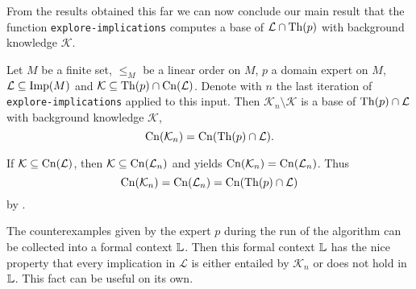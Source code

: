 From the results obtained this far we can now conclude our main result that the function
\lstinline{explore-implications} computes a base of $\mathcal{L} \cap \operatorname{Th}(p)$ with
background knowledge $\mathcal{K}$.

\begin{Theorem}
  \label{thm:explore-implications-correctness}
  Let $M$ be a finite set, $\leq_{M}$ be a linear order on $M$, $p$ a domain expert on
  $M$, $\mathcal{L} \subseteq \operatorname{Imp}(M)$ and $\mathcal{K} \subseteq \operatorname{Th}(p) \cap
  \operatorname{Cn}(\mathcal{L})$.  Denote with $n$ the last iteration of
  \lstinline{explore-implications} applied to this input.  Then $\mathcal{K}_{n} \setminus
  \mathcal{K}$ is a base of $\operatorname{Th}(p) \cap \mathcal{L}$ with background knowledge
  $\mathcal{K}$, \ie
  \begin{equation*}
    \operatorname{Cn}(\mathcal{K}_{n}) = \operatorname{Cn}(\operatorname{Th}(p) \cap \mathcal{L}).
  \end{equation*}
\end{Theorem}
\begin{Proof}
  If $\mathcal{K} \subseteq \operatorname{Cn}(\mathcal{L})$, then $\mathcal{K} \subseteq
  \operatorname{Cn}(\mathcal{L}_{n})$ and  yields
  $\operatorname{Cn}(\mathcal{K}_{n}) = \operatorname{Cn}(\mathcal{L}_{n})$.  Thus
  \begin{equation*}
    \operatorname{Cn}(\mathcal{K}_{n}) = \operatorname{Cn}(\mathcal{L}_{n}) = \operatorname{Cn}(\operatorname{Th}(p) \cap \mathcal{L})
  \end{equation*}
  by .
\end{Proof}

The counterexamples given by the expert $p$ during the run of the algorithm can be
collected into a formal context ${\mathbb{L}}$.  Then this formal context ${\mathbb{L}}$ has the nice
property that every implication in $\mathcal{L}$ is either entailed by $\mathcal{K}_{n}$
or does not hold in ${\mathbb{L}}$.  This fact can be useful on its own.

